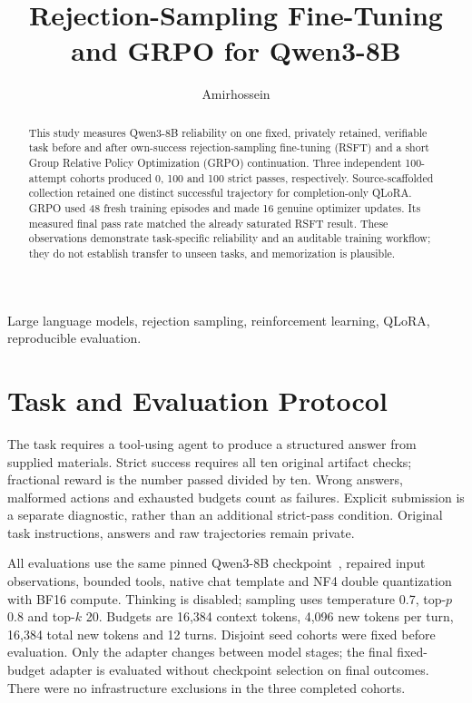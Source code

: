 \documentclass[10pt,journal,onecolumn,a4paper]{IEEEtran}
\title{Rejection-Sampling Fine-Tuning and GRPO for Qwen3-8B}
\author{Amirhossein}
\begin{document}
\maketitle
\begin{abstract}
This study measures Qwen3-8B reliability on one fixed, privately retained, verifiable task before and after own-success rejection-sampling fine-tuning (RSFT) and a short Group Relative Policy Optimization (GRPO) continuation. Three independent 100-attempt cohorts produced 0, 100 and 100 strict passes, respectively. Source-scaffolded collection retained one distinct successful trajectory for completion-only QLoRA. GRPO used 48 fresh training episodes and made 16 genuine optimizer updates. Its measured final pass rate matched the already saturated RSFT result. These observations demonstrate task-specific reliability and an auditable training workflow; they do not establish transfer to unseen tasks, and memorization is plausible.
\end{abstract}
\begin{IEEEkeywords}
Large language models, rejection sampling, reinforcement learning, QLoRA, reproducible evaluation.
\end{IEEEkeywords}

\section{Task and Evaluation Protocol}
The task requires a tool-using agent to produce a structured answer from supplied materials. Strict success requires all ten original artifact checks; fractional reward is the number passed divided by ten. Wrong answers, malformed actions and exhausted budgets count as failures. Explicit submission is a separate diagnostic, rather than an additional strict-pass condition. Original task instructions, answers and raw trajectories remain private.

All evaluations use the same pinned Qwen3-8B checkpoint~\cite{qwen}, repaired input observations, bounded tools, native chat template and NF4 double quantization with BF16 compute. Thinking is disabled; sampling uses temperature 0.7, top-$p$ 0.8 and top-$k$ 20. Budgets are 16,384 context tokens, 4,096 new tokens per turn, 16,384 total new tokens and 12 turns. Disjoint seed cohorts were fixed before evaluation. Only the adapter changes between model stages; the final fixed-budget adapter is evaluated without checkpoint selection on final outcomes. There were no infrastructure exclusions in the three completed cohorts.
\end{document}
